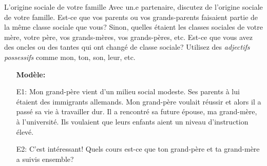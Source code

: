 \begin{frame}{L'origine sociale de votre famille}
  Avec un.e partenaire, discutez de l'origine sociale de \alert{votre} famille.
  Est-ce que \alert{vos} parents ou \alert{vos} grands-parents faisaient partie de la même classe sociale que vous?
  Sinon, quelles étaient les classes sociales de \alert{votre} mère, \alert{votre} père, \alert{vos} grands-mères, \alert{vos} grands-pères, etc.
  Est-ce que vous avez des oncles ou des tantes qui ont changé de classe sociale?
  Utilisez des \emph{adjectifs possessifs} comme \alert{mon}, \alert{ton}, \alert{son}, \alert{leur}, etc.
  \begin{itemize}
    \item[] \textbf{Modèle:}
    \item[E1:] \alert{Mon} grand-père vient d'un milieu social modeste. \alert{Ses} parents à lui étaient des immigrants allemands. \alert{Mon} grand-père voulait réussir et alors il a passé \alert{sa}
    vie à travailler dur. Il a rencontré \alert{sa} future épouse, \alert{ma} grand-mère, à l'université. Ils voulaient que \alert{leurs} enfants aient un niveau d'instruction élevé.
    \item[E2:] C'est intéressant! Quels cours est-ce que \alert{ton} grand-père et \alert{ta} grand-mère a suivis ensemble?
  \end{itemize}
\end{frame}